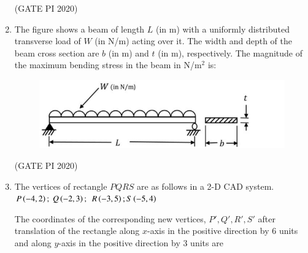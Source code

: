 \documentclass[journal,12pt,onecolumn]{IEEEtran}
\theoremstyle{remark}
\begin{document}
\begin{enumerate}
\begin{enumerate}
\setlength{\itemsep}{0.5em}
\end{enumerate}

\hfill (GATE PI 2020)

\item The figure shows a beam of length $L$ (in m) with a uniformly distributed transverse load of $W$ (in N/m) acting over it. The width and depth of the beam cross section are $b$ (in m) and $t$ (in m), respectively. The magnitude of the maximum bending stress in the beam in N/m$^2$ is:

\begin{figure}[h]
    \centering
    \includegraphics[width=0.5\columnwidth]{figs/fig12.png}
    \caption{}
    \label{fig:placeholder}
\end{figure}

\begin{enumerate}
\setlength{\itemsep}{0.5em}
\end{enumerate}


\hfill (GATE PI 2020)

\item The vertices of rectangle $PQRS$ are as follows in a 2-D CAD system.
$P\left(-4,2\right);\ Q\left(-2,3\right); $
$ R\left(-3,5\right);S\left(-5,4\right)$

The coordinates of the corresponding new vertices, $P', Q', R', S'$ after translation of the rectangle along $x$-axis in the positive direction by $6$ units and along $y$-axis in the positive direction by $3$ units are


\end{enumerate}
\end{document}
